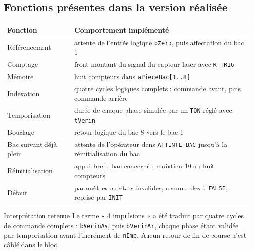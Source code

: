 {  \subsection{Fonctions présentes dans la version réalisée}
  \begin{tabularx}{\linewidth}{@{}L{37mm}Y@{}}
    \toprule
    \textbf{Fonction} & \textbf{Comportement implémenté}\\
    \midrule
    Référencement & attente de l'entrée logique \texttt{bZero}, puis affectation du bac 1\\
    Comptage & front montant du signal du capteur laser avec \texttt{R\_TRIG}\\
    Mémoire & huit compteurs dans \texttt{aPieceBac[1..8]}\\
    Indexation & quatre cycles logiques complets : commande avant, puis commande arrière\\
    Temporisation & durée de chaque phase simulée par un \texttt{TON} réglé avec \texttt{tVerin}\\
    Bouclage & retour logique du bac 8 vers le bac 1\\
    Bac suivant déjà plein & attente de l'opérateur dans \texttt{ATTENTE\_BAC} jusqu'à la réinitialisation du bac\\
    Réinitialisation & appui bref : bac concerné ; maintien 10 s : huit compteurs\\
    Défaut & paramètres ou états invalides, commandes à \texttt{FALSE}, reprise par \texttt{INIT}\\
    \bottomrule
  \end{tabularx}

  \begin{notebox}[colback=ekwarning,colframe=orange!35]{Interprétation retenue}
    Le terme « 4 impulsions » a été traduit par quatre cycles de commande complets : \texttt{bVerinAv}, puis \texttt{bVerinAr}, chaque phase étant validée par temporisation avant l'incrément de \texttt{nImp}. Aucun retour de fin de course n'est câblé dans le bloc.
  \end{notebox}
}

\newpage

